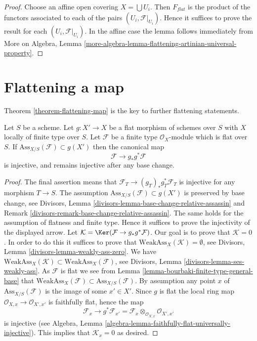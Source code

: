 \begin{proof}
Choose an affine open covering $X = \bigcup U_i$.
Then $F_{flat}$ is the product of the functors associated to
each of the pairs $(U_i, \mathcal{F}|_{U_i})$.
Hence it suffices to prove the result for each
$(U_i, \mathcal{F}|_{U_i})$.
In the affine case the lemma follows immediately from
More on Algebra,
Lemma \ref{more-algebra-lemma-flattening-artinian-universal-property}.
\end{proof}






\section{Flattening a map}
\label{section-fattening-map}

\noindent
Theorem \ref{theorem-flattening-map}
is the key to further flattening statements.

\begin{lemma}
\label{lemma-universally-separating}
Let $S$ be a scheme.
Let $g : X' \to X$ be a flat morphism of schemes over $S$
with $X$ locally of finite type over $S$.
Let $\mathcal{F}$ be a finite type $\mathcal{O}_X$-module
which is flat over $S$. If $\text{Ass}_{X/S}(\mathcal{F}) \subset g(X')$
then the canonical map
$$
\mathcal{F} \longrightarrow g_*g^*\mathcal{F}
$$
is injective, and remains injective after any base change.
\end{lemma}

\begin{proof}
The final assertion means that $\mathcal{F}_T \to (g_T)_*g_T^*\mathcal{F}_T$
is injective for any morphism $T \to S$. The assumption
$\text{Ass}_{X/S}(\mathcal{F}) \subset g(X')$ is preserved by base change, see
Divisors, Lemma \ref{divisors-lemma-base-change-relative-assassin} and
Remark \ref{divisors-remark-base-change-relative-assassin}.
The same holds for the assumption of flatness and finite type.
Hence it suffices to prove the injectivity of the displayed arrow.
Let $\mathcal{K} = \Ker(\mathcal{F} \to g_*g^*\mathcal{F})$.
Our goal is to prove that $\mathcal{K} = 0$.
In order to do this it suffices to prove that
$\text{WeakAss}_X(\mathcal{K}) = \emptyset$, see
Divisors, Lemma \ref{divisors-lemma-weakly-ass-zero}.
We have
$\text{WeakAss}_X(\mathcal{K}) \subset \text{WeakAss}_X(\mathcal{F})$, see
Divisors, Lemma \ref{divisors-lemma-ses-weakly-ass}.
As $\mathcal{F}$ is flat we see from
Lemma \ref{lemma-bourbaki-finite-type-general-base}
that $\text{WeakAss}_X(\mathcal{F}) \subset \text{Ass}_{X/S}(\mathcal{F})$.
By assumption any point $x$ of $\text{Ass}_{X/S}(\mathcal{F})$
is the image of some $x' \in X'$. Since $g$ is flat the
local ring map $\mathcal{O}_{X, x} \to \mathcal{O}_{X', x'}$
is faithfully flat, hence the map
$$
\mathcal{F}_x
\longrightarrow
g^*\mathcal{F}_{x'} =
\mathcal{F}_x \otimes_{\mathcal{O}_{X, x}} \mathcal{O}_{X', x'}
$$
is injective (see
Algebra, Lemma \ref{algebra-lemma-faithfully-flat-universally-injective}).
This implies that $\mathcal{K}_x = 0$ as desired.
\end{proof}

